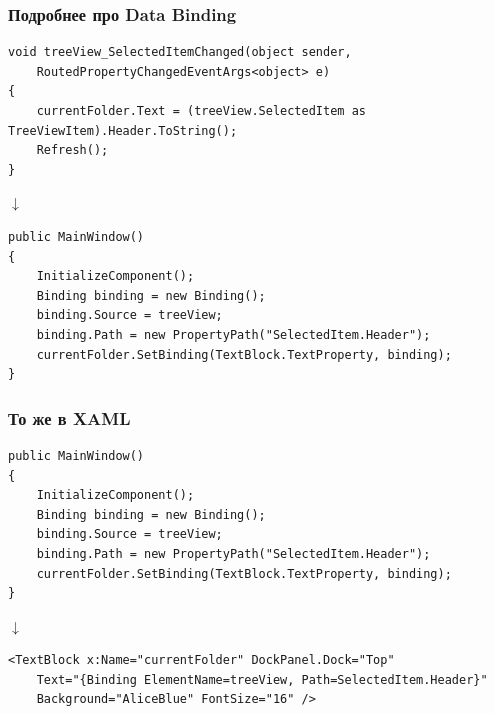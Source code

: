 \documentclass[xetex,mathserif,serif]{beamer}
\newcommand{\DownArrow} {
    \hspace{2cm}\begin{LARGE}$\downarrow$\end{LARGE}
}
\begin{document}
    \begin{frame}[fragile]
        \frametitle{Подробнее про Data Binding}
        \begin{footnotesize}
            \begin{verbatim}
void treeView_SelectedItemChanged(object sender,
    RoutedPropertyChangedEventArgs<object> e)
{
    currentFolder.Text = (treeView.SelectedItem as TreeViewItem).Header.ToString();
    Refresh();
}
            \end{verbatim}
        \end{footnotesize}
        \DownArrow
        \begin{footnotesize}
            \begin{verbatim}
public MainWindow()
{
    InitializeComponent();
    Binding binding = new Binding();
    binding.Source = treeView;
    binding.Path = new PropertyPath("SelectedItem.Header");
    currentFolder.SetBinding(TextBlock.TextProperty, binding);
}
            \end{verbatim}
        \end{footnotesize}
    \end{frame}

    \begin{frame}[fragile]
        \frametitle{То же в XAML}
        \begin{footnotesize}
            \begin{verbatim}
public MainWindow()
{
    InitializeComponent();
    Binding binding = new Binding();
    binding.Source = treeView;
    binding.Path = new PropertyPath("SelectedItem.Header");
    currentFolder.SetBinding(TextBlock.TextProperty, binding);
}
            \end{verbatim}
        \end{footnotesize}
        \DownArrow
        \begin{footnotesize}
            \begin{verbatim}
<TextBlock x:Name="currentFolder" DockPanel.Dock="Top"
    Text="{Binding ElementName=treeView, Path=SelectedItem.Header}"
    Background="AliceBlue" FontSize="16" />
            \end{verbatim}
        \end{footnotesize}
    \end{frame}
\end{document}
